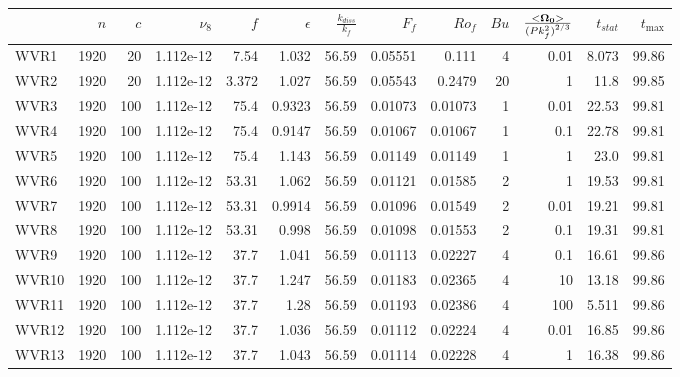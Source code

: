 \documentclass[a4paper]{article}
\begin{document}
\begin{tabular}{lrrrrrrrrrrrr}
\toprule
{} &   $n$ &  $c$ &   $\nu_8$ &   $f$ &  $\epsilon$ &  $\frac{k_{diss}}{k_f}$ &   $F_f$ &  $Ro_f$ &  $Bu$ &  $\frac{<\bf \Omega_0 >}{{(P k_f^2)}^{2/3}}$ &  $t_{stat}$ &  $t_{\max}$ \\
\midrule
WVR1  &  1920 &   20 & 1.112e-12 &  7.54 &       1.032 &                   56.59 & 0.05551 &   0.111 &     4 &                                         0.01 &       8.073 &       99.86 \\
WVR2  &  1920 &   20 & 1.112e-12 & 3.372 &       1.027 &                   56.59 & 0.05543 &  0.2479 &    20 &                                            1 &        11.8 &       99.85 \\
WVR3  &  1920 &  100 & 1.112e-12 &  75.4 &      0.9323 &                   56.59 & 0.01073 & 0.01073 &     1 &                                         0.01 &       22.53 &       99.81 \\
WVR4  &  1920 &  100 & 1.112e-12 &  75.4 &      0.9147 &                   56.59 & 0.01067 & 0.01067 &     1 &                                          0.1 &       22.78 &       99.81 \\
WVR5  &  1920 &  100 & 1.112e-12 &  75.4 &       1.143 &                   56.59 & 0.01149 & 0.01149 &     1 &                                            1 &        23.0 &       99.81 \\
WVR6  &  1920 &  100 & 1.112e-12 & 53.31 &       1.062 &                   56.59 & 0.01121 & 0.01585 &     2 &                                            1 &       19.53 &       99.81 \\
WVR7  &  1920 &  100 & 1.112e-12 & 53.31 &      0.9914 &                   56.59 & 0.01096 & 0.01549 &     2 &                                         0.01 &       19.21 &       99.81 \\
WVR8  &  1920 &  100 & 1.112e-12 & 53.31 &       0.998 &                   56.59 & 0.01098 & 0.01553 &     2 &                                          0.1 &       19.31 &       99.81 \\
WVR9  &  1920 &  100 & 1.112e-12 &  37.7 &       1.041 &                   56.59 & 0.01113 & 0.02227 &     4 &                                          0.1 &       16.61 &       99.86 \\
WVR10 &  1920 &  100 & 1.112e-12 &  37.7 &       1.247 &                   56.59 & 0.01183 & 0.02365 &     4 &                                           10 &       13.18 &       99.86 \\
WVR11 &  1920 &  100 & 1.112e-12 &  37.7 &        1.28 &                   56.59 & 0.01193 & 0.02386 &     4 &                                          100 &       5.511 &       99.86 \\
WVR12 &  1920 &  100 & 1.112e-12 &  37.7 &       1.036 &                   56.59 & 0.01112 & 0.02224 &     4 &                                         0.01 &       16.85 &       99.86 \\
WVR13 &  1920 &  100 & 1.112e-12 &  37.7 &       1.043 &                   56.59 & 0.01114 & 0.02228 &     4 &                                            1 &       16.38 &       99.86 \\
\bottomrule
\end{tabular}
\end{document}
